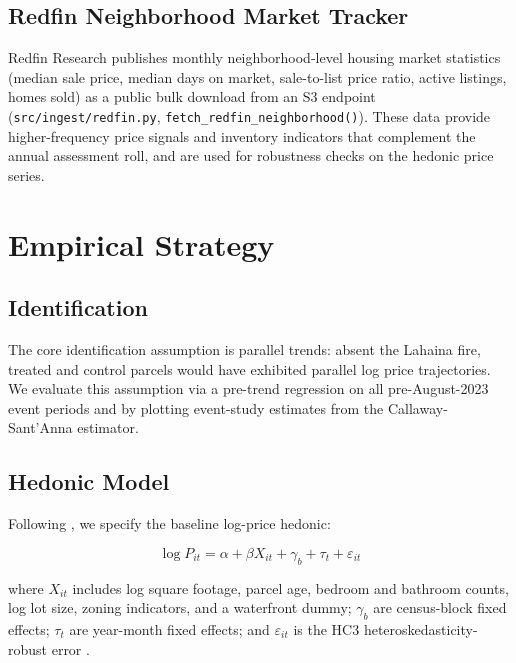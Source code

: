 \documentclass[12pt]{article}
\begin{document}
\subsection{Redfin Neighborhood Market Tracker}

Redfin Research publishes monthly neighborhood-level housing market statistics
(median sale price, median days on market, sale-to-list price ratio, active
listings, homes sold) as a public bulk download from an S3 endpoint
(\texttt{src/ingest/redfin.py}, \texttt{fetch\_redfin\_neighborhood()}).
These data provide higher-frequency price signals and inventory indicators
that complement the annual assessment roll, and are used for robustness
checks on the hedonic price series.

\section{Empirical Strategy}
\label{sec:empirical}

\subsection{Identification}

The core identification assumption is parallel trends: absent the Lahaina fire,
treated and control parcels would have exhibited parallel log price trajectories.
We evaluate this assumption via a pre-trend regression on all pre-August-2023
event periods and by plotting event-study estimates from the Callaway-Sant'Anna
estimator.

\subsection{Hedonic Model}

Following \citet{Rosen1974}, we specify the baseline log-price hedonic:

\begin{equation}
  \log P_{it} = \alpha + \beta X_{it} + \gamma_b + \tau_t + \varepsilon_{it}
  \label{eq:hedonic}
\end{equation}

where $X_{it}$ includes log square footage, parcel age, bedroom and bathroom
counts, log lot size, zoning indicators, and a waterfront dummy; $\gamma_b$ are
census-block fixed effects; $\tau_t$ are year-month fixed effects; and
$\varepsilon_{it}$ is the HC3 heteroskedasticity-robust error \citep{MacKinnon1985}.
\end{document}

